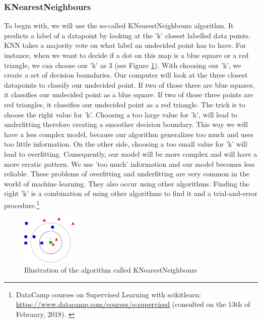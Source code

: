 \documentclass[11pt]{article}
\begin{document}
\subsubsection{KNearestNeighbours}
\label{sec:orgae4b6e7}

To begin with, we will use the so-called KNearestNeighbours algorithm. It predicts a label of a datapoint by looking at the 'k' closest labelled data points. KNN takes a majority vote on what label an undecided point has to have. For instance, when we want to decide if a dot on this map is a blue square or a red triangle, we can choose our 'k' as 3 (see Figure \ref{tab:knn}). With choosing our 'k', we create a set of decision boundaries. Our computer will look at the three closest datapoints to classify our undecided point. If two of those three are blue squares, it classifies our undecided point as a blue square. If two of those three points are red triangles, it classifies our undecided point as a red triangle. The trick is to choose the right value for 'k'. Choosing a too large value for 'k', will lead to underfitting therefore creating a smoother decision boundary. This way we will have a less complex model, because our algorithm generalizes too much and uses too little information. On the other side, choosing a too small value for 'k' will lead to overfitting. Consequently, our model will be more complex and will have a more erratic pattern. We use 'too much' information and our model becomes less reliable. These problems of overfitting and underfitting are very common in the world of machine learning. They also occur using other algorithms. Finding the right 'k' is a combination of using other algorithms to find it and a trial-and-error procedure.\footnote{DataCamp courses on Supervised Learning with scikitlearn: \url{https://www.datacamp.com/courses/q:supervised} (consulted on the 13th of February, 2018). \label{fn:datacamp}}

\begin{figure}[htbp]
\centering
\includegraphics[width=100px]{./KnnClassification.png}
\caption{\label{tab:knn}
Illustration of the algorithm called KNearestNeighbours}
\end{figure} 
\end{document}
